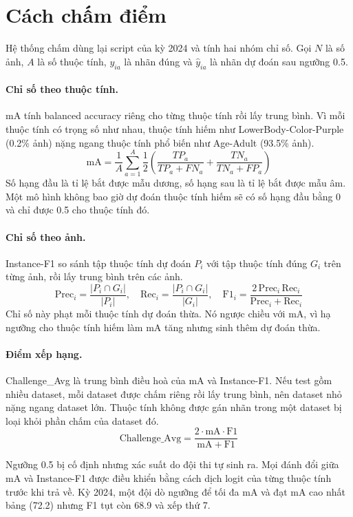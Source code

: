 \documentclass[11pt,a4paper]{article}
\begin{document}
\section{Cách chấm điểm}

Hệ thống chấm dùng lại script của kỳ 2024 và tính hai nhóm chỉ số. Gọi $N$ là số ảnh, $A$ là số thuộc tính, $y_{ia}$ là nhãn đúng và $\hat y_{ia}$ là nhãn dự đoán sau ngưỡng 0.5.

\paragraph{Chỉ số theo thuộc tính.} mA tính balanced accuracy riêng cho từng thuộc tính rồi lấy trung bình. Vì mỗi thuộc tính có trọng số như nhau, thuộc tính hiếm như LowerBody-Color-Purple (0.2\% ảnh) nặng ngang thuộc tính phổ biến như Age-Adult (93.5\% ảnh).
\[
\mathrm{mA} = \frac{1}{A}\sum_{a=1}^{A}\frac{1}{2}\left(\frac{TP_a}{TP_a+FN_a}+\frac{TN_a}{TN_a+FP_a}\right)
\]
Số hạng đầu là tỉ lệ bắt được mẫu dương, số hạng sau là tỉ lệ bắt được mẫu âm. Một mô hình không bao giờ dự đoán thuộc tính hiếm sẽ có số hạng đầu bằng 0 và chỉ được 0.5 cho thuộc tính đó.

\paragraph{Chỉ số theo ảnh.} Instance-F1 so sánh tập thuộc tính dự đoán $P_i$ với tập thuộc tính đúng $G_i$ trên từng ảnh, rồi lấy trung bình trên các ảnh.
\[
\mathrm{Prec}_i=\frac{|P_i\cap G_i|}{|P_i|},\quad \mathrm{Rec}_i=\frac{|P_i\cap G_i|}{|G_i|},\quad
\mathrm{F1}_i=\frac{2\,\mathrm{Prec}_i\,\mathrm{Rec}_i}{\mathrm{Prec}_i+\mathrm{Rec}_i}
\]
Chỉ số này phạt mỗi thuộc tính dự đoán thừa. Nó ngược chiều với mA, vì hạ ngưỡng cho thuộc tính hiếm làm mA tăng nhưng sinh thêm dự đoán thừa.

\paragraph{Điểm xếp hạng.} Challenge\_Avg là trung bình điều hoà của mA và Instance-F1. Nếu test gồm nhiều dataset, mỗi dataset được chấm riêng rồi lấy trung bình, nên dataset nhỏ nặng ngang dataset lớn. Thuộc tính không được gán nhãn trong một dataset bị loại khỏi phần chấm của dataset đó.
\[
\mathrm{Challenge\_Avg}=\frac{2\cdot\mathrm{mA}\cdot\mathrm{F1}}{\mathrm{mA}+\mathrm{F1}}
\]

\begin{ghichu}
Ngưỡng 0.5 bị cố định nhưng xác suất do đội thi tự sinh ra. Mọi đánh đổi giữa mA và Instance-F1 được điều khiển bằng cách dịch logit của từng thuộc tính trước khi trả về. Kỳ 2024, một đội dò ngưỡng để tối đa mA và đạt mA cao nhất bảng (72.2) nhưng F1 tụt còn 68.9 và xếp thứ 7.
\end{ghichu}
\end{document}

